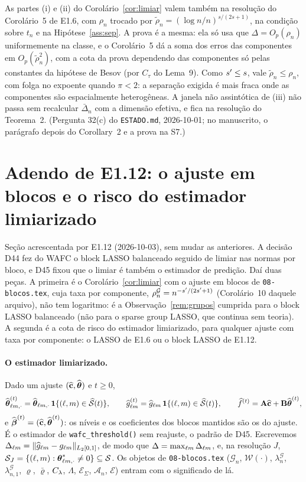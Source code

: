\documentclass[11pt,a4paper]{article}
\newcommand{\Amat}{\mathbf{A}}
\newcommand{\Bmat}{\mathbf{B}}
\newcommand{\bbeta}{\boldsymbol{\beta}}
\newcommand{\betahat}{\widehat{\bbeta}}
\newcommand{\ghat}[2]{\widehat{g}_{#1#2}}
\newcommand{\Shat}{\widehat{\mathcal{S}}}
\newcommand{\rn}{\rho}
\newcommand{\Gcal}{\mathcal{G}}
\newcommand{\lamG}{\lambda^{\mathcal{G}}_{n}}
\newcommand{\lamGone}{\lambda^{\mathcal{G}}_{n,1}}
\newcommand{\rhoG}{\rho^{\mathcal{G}}_{n}}
\newcommand{\ESig}{\mathcal{E}_{\Sigma}}
\newcommand{\Acal}{\mathcal{A}_{n}}
\newcommand{\Ecal}{\mathcal{E}}
\newcommand{\Dbl}{\Delta_{\cv\md}}
\begin{document}
\begin{remark}\label{rem:compressivel}
As partes (i) e (ii) do Corolário~\ref{cor:limiar} valem também na resolução
do Corolário~5 de E1.6, com $\rn_{n}$ trocado por
$\tilde\rho_{n} = (\log n/n)^{s/(2s+1)}$, na condição sobre $t_{n}$ e na
Hipótese~\ref{ass:sep}. A prova é a mesma: ela só usa que
$\Delta = O_{p}(\rn_{n})$ uniformemente na classe, e o Corolário~5 dá a soma
dos erros das componentes em $O_{p}(\tilde\rho_{n}^{2})$, com a cota da prova
dependendo das componentes só pelas constantes da hipótese de Besov (por
$C_{\tau}$ do Lema~9). Como $s' \le s$, vale $\tilde\rho_{n} \le \rn_{n}$, com
folga no expoente quando $\pi < 2$: a separação exigida é mais fraca onde as
componentes são espacialmente heterogêneas. A janela não assintótica de (iii)
não passa sem recalcular $\bar{\Delta}_{n}$ com a dimensão efetiva, e fica na
resolução do Teorema~2. (Pergunta 32(c) do \texttt{ESTADO.md}, 2026-10-01; no
manuscrito, o parágrafo depois do Corollary~2 e a prova na S7.)
\end{remark}

\section{Adendo de E1.12: o ajuste em blocos e o risco do estimador
limiarizado}\label{sec:adendo-blocos}

Seção acrescentada por E1.12 (2026-10-03), sem mudar as anteriores. A decisão
D44 fez do WAFC o block LASSO balanceado seguido de limiar nas normas por
bloco, e D45 fixou que o limiar é também o estimador de predição. Daí duas
peças. A primeira é o Corolário~\ref{cor:limiar} com o ajuste em blocos de
\texttt{08-blocos.tex}, cuja taxa por componente, $\rhoG =
n^{-\seff/(2\seff+1)}$ (Corolário~10 daquele arquivo), não tem logaritmo: é a
Observação~\ref{rem:grupos} cumprida para o block LASSO balanceado (não para
o sparse group LASSO, que continua sem teoria). A segunda é a cota de risco do
estimador limiarizado, para qualquer ajuste com taxa por componente: o LASSO
de E1.6 ou o block LASSO de E1.12.

\paragraph{O estimador limiarizado.} Dado um ajuste $(\widehat{\mathbf{c}},\widehat{\boldsymbol{\theta}})$ e
$t \ge 0$,
\[
  \thetahat^{(t)}_{\cv\md,\cdot} = \thetahat_{\cv\md,\cdot}\,
  \mathbf{1}\{(\cv,\md)\in\Shat(t)\},
  \qquad
  \ghat{\cv}{\md}^{(t)} = \ghat{\cv}{\md}\,\mathbf{1}\{(\cv,\md)\in\Shat(t)\},
  \qquad
  \widehat f^{(t)} = \Amat\chat + \Bmat\thetahat^{(t)},
\]
e $\betahat^{(t)} = (\chat,\thetahat^{(t)})$: os níveis e os coeficientes dos
blocos mantidos são os do ajuste. É o estimador de \texttt{wafc\_threshold()}
sem reajuste, o padrão de D45. Escrevemos $\Dbl =
\lVert\ghat{\cv}{\md} - \gcomp{\cv}{\md}\rVert_{L_{2}[0,1]}$, de modo que
$\Delta = \max_{\cv\md}\Dbl$, e, na resolução $J$, $\mathcal{S}_{J} =
\{(\ell,m) : \boldsymbol{\theta}^{*}_{\ell m,\cdot} \ne 0\} \subseteq \mathcal{S}$. Os
objetos de \texttt{08-blocos.tex} ($\Gcal_{n}$, $\mathcal{W}(\cdot)$, $\lamG$, $\lamGone$,
$\varrho$, $\bar\varrho$, $C_{\lambda}$, $\Lambda$, $\ESig$, $\Acal$, $\Ecal$) entram com o
significado de lá.
\end{document}

